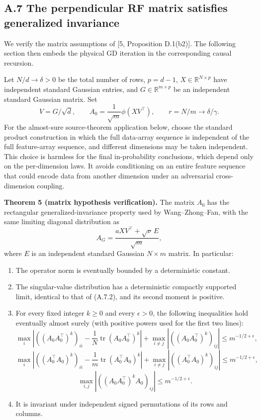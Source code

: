 \documentclass[
  11pt,
  a4paper,
]{article}
\providecommand{\tightlist}{%
  \setlength{\itemsep}{0pt}\setlength{\parskip}{0pt}}
\begin{document}
\hypertarget{a.7-the-perpendicular-rf-matrix-satisfies-generalized-invariance}{%
\subsection{A.7 The perpendicular RF matrix satisfies generalized
invariance}\label{a.7-the-perpendicular-rf-matrix-satisfies-generalized-invariance}}

We verify the matrix assumptions of {[}5, Proposition D.1(b2){]}. The
following section then embeds the physical GD iteration in the
corresponding causal recursion.

Let \(N/d\to\delta>0\) be the total number of rows, \(p=d-1\),
\(X\in\mathbb R^{N\times p}\) have independent standard Gaussian
entries, and \(G\in\mathbb R^{m\times p}\) be an independent standard
Gaussian matrix. Set \[
V=G/\sqrt d,\qquad
A_0=\frac1{\sqrt m}\phi(XV^\top),\qquad r=N/m\to\delta/\gamma.
\tag{A.7.1}
\] For the almost-sure source-theorem application below, choose the
standard product construction in which the full data-array sequence is
independent of the full feature-array sequence, and different dimensions
may be taken independent. This choice is harmless for the final
in-probability conclusions, which depend only on the per-dimension laws.
It avoids conditioning on an entire feature sequence that could encode
data from another dimension under an adversarial cross-dimension
coupling.

\textbf{Theorem 5 (matrix hypothesis verification).} The matrix \(A_0\)
has the rectangular generalized-invariance property used by
Wang--Zhong--Fan, with the same limiting diagonal distribution as \[
A_G=\frac{aXV^\top+\sqrt\nu\,E}{\sqrt m},
\tag{A.7.2}
\] where \(E\) is an independent standard Gaussian \(N\times m\) matrix.
In particular:

\begin{enumerate}
\def\labelenumi{\arabic{enumi}.}
\tightlist
\item
  The operator norm is eventually bounded by a deterministic constant.
\item
  The singular-value distribution has a deterministic compactly
  supported limit, identical to that of (A.7.2), and its second moment
  is positive.
\item
  For every fixed integer \(k\ge0\) and every \(\epsilon>0\), the
  following inequalities hold eventually almost surely (with positive
  powers used for the first two lines): \[
  \max_i\left|((A_0A_0^\top)^k)_{ii}-\frac1N\operatorname{tr}(A_0A_0^\top)^k\right|
  +\max_{i\ne j}|((A_0A_0^\top)^k)_{ij}|
  \le m^{-1/2+\epsilon},
  \tag{A.7.3}
  \] \[
  \max_i\left|((A_0^\top A_0)^k)_{ii}-\frac1m\operatorname{tr}(A_0^\top A_0)^k\right|
  +\max_{i\ne j}|((A_0^\top A_0)^k)_{ij}|
  \le m^{-1/2+\epsilon},
  \tag{A.7.4}
  \] \[
  \max_{i,j}|((A_0A_0^\top)^kA_0)_{ij}|\le m^{-1/2+\epsilon}.
  \tag{A.7.5}
  \]
\item
  It is invariant under independent signed permutations of its rows and
  columns.
\end{enumerate}
\end{document}
